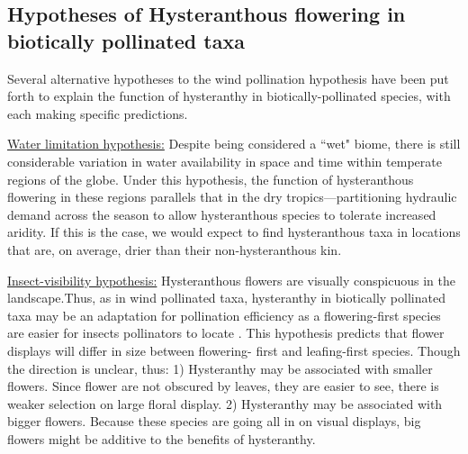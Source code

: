 \documentclass{article}[11pt]
\begin{document}

\subsection*{Hypotheses of Hysteranthous flowering in biotically pollinated taxa}
Several alternative hypotheses to the wind pollination hypothesis have been put forth to explain the function of hysteranthy in biotically-pollinated species, with each making specific predictions. 
 
\underline{Water limitation hypothesis:} Despite being considered a ``wet" biome, there is still considerable variation in water availability in space and time within temperate regions of the globe. Under this hypothesis, the function of hysteranthous flowering in these regions parallels that in the dry tropics---partitioning hydraulic demand across the season to allow hysteranthous species to tolerate increased aridity. If this is the case, we would expect to find hysteranthous taxa in locations that are, on average, drier than their non-hysteranthous kin.


\underline{Insect-visibility hypothesis:} Hysteranthous flowers are visually conspicuous in the landscape.Thus, as in wind pollinated taxa, hysteranthy in biotically pollinated taxa may be an adaptation for pollination efficiency as a flowering-first species are easier for insects pollinators to locate \citep{Janzen1967}. This hypothesis predicts that flower displays will differ in size between flowering- first and leafing-first species. Though the direction is unclear, thus: 1) Hysteranthy may be associated with smaller flowers. Since flower are not obscured by leaves, they are easier to see, there is weaker selection on large floral display. 2) Hysteranthy may be associated with bigger flowers. Because these species are going all in on visual displays, big flowers might be additive to the benefits of hysteranthy. 
\end{document}
